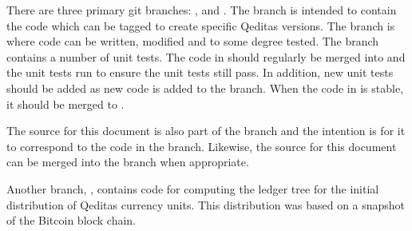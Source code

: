 There are three primary git branches: \master, {\dev} and \testing.
The {\master} branch is intended to contain the code which can be tagged to create
specific Qeditas versions.
The {\dev} branch is where code can be written, modified and to some degree tested.
The {\testing} branch contains a number of unit tests.
The code in {\dev} should regularly be merged into {\testing} and
the unit tests run to ensure the unit tests still pass.
In addition, new unit tests should be added as new code is added to the {\dev} branch.
When the code in {\dev} is stable, it should be merged to \master.

The source for this document is also part of the {\dev} branch and
the intention is for it to correspond to the code in the {\dev} branch.
Likewise, the source for this document can be merged into the {\master} branch
when appropriate.

Another branch, \initdistr, contains code for computing the ledger tree for
the initial distribution of Qeditas currency units. This distribution
was based on a snapshot of the Bitcoin block chain.

